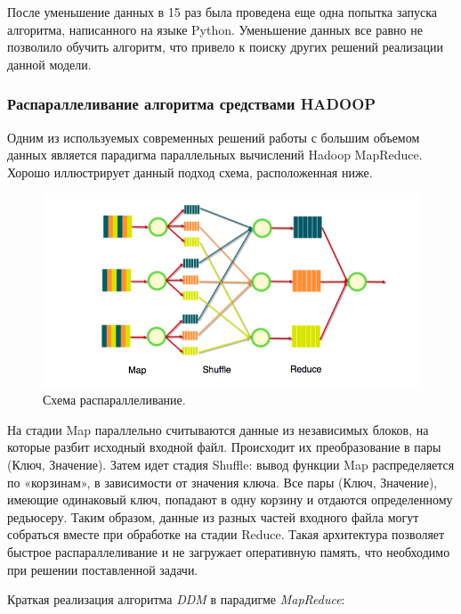 После уменьшение данных в 15 раз была проведена еще одна попытка запуска алгоритма,
написанного на языке Python. Уменьшение данных все равно не позволило обучить
алгоритм, что привело к поиску других решений реализации данной модели.

\subsubsection{Распараллеливание алгоритма средствами HADOOP}

Одним из используемых современных решений работы с большим объемом данных
является парадигма параллельных вычислений Hadoop MapReduce. Хорошо иллюстрирует
данный подход схема, расположенная ниже.

\begin{figure}[H]
\centering 
    \includegraphics[scale=0.6]{image/MapRed.png}
    \caption{Схема распараллеливание.}
    \label{srg}
\end{figure}

На стадии Map параллельно считываются данные из независимых блоков, на которые
разбит исходный входной файл. Происходит их преобразование в пары (Ключ, Значение).
Затем идет стадия Shuffle: вывод функции Map распределяется по «корзинам», в
зависимости от значения ключа. Все пары (Ключ, Значение), имеющие одинаковый ключ,
попадают в одну корзину и отдаются определенному редьюсеру. Таким образом, данные
из разных частей входного файла могут собраться вместе при обработке на стадии
Reduce. Такая архитектура позволяет быстрое распараллеливание и не загружает
оперативную память, что необходимо при решении поставленной задачи.

Краткая реализация алгоритма \textit{DDM} в парадигме \textit{MapReduce}:


